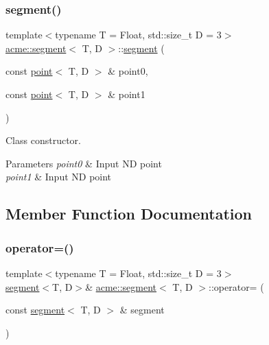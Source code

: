 \subsubsection{\texorpdfstring{segment()}{segment()}}
{\footnotesize\ttfamily template$<$typename T = Float, std\+::size\+\_\+t D = 3$>$ \\
\hyperlink{classacme_1_1segment}{acme\+::segment}$<$ T, D $>$\+::\hyperlink{classacme_1_1segment}{segment} (\begin{DoxyParamCaption}\item[{const \hyperlink{classacme_1_1point}{point}$<$ T, D $>$ \&}]{point0,  }\item[{const \hyperlink{classacme_1_1point}{point}$<$ T, D $>$ \&}]{point1 }\end{DoxyParamCaption})\hspace{0.3cm}{\ttfamily [inline]}}



Class constructor. 


\begin{DoxyParams}{Parameters}
{\em point0} & Input ND point \\
\hline
{\em point1} & Input ND point \\
\hline
\end{DoxyParams}


\subsection{Member Function Documentation}
\mbox{\label{classacme_1_1segment_a5b62f05585b6d9e1f7189467358e2c54}} 
\subsubsection{\texorpdfstring{operator=()}{operator=()}}
{\footnotesize\ttfamily template$<$typename T = Float, std\+::size\+\_\+t D = 3$>$ \\
\hyperlink{classacme_1_1segment}{segment}$<$T, D$>$\& \hyperlink{classacme_1_1segment}{acme\+::segment}$<$ T, D $>$\+::operator= (\begin{DoxyParamCaption}\item[{const \hyperlink{classacme_1_1segment}{segment}$<$ T, D $>$ \&}]{segment }\end{DoxyParamCaption})\hspace{0.3cm}{\ttfamily [inline]}}



